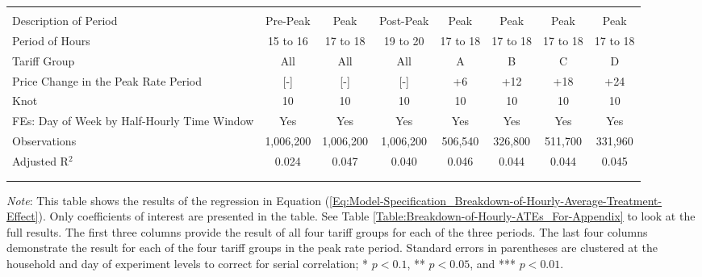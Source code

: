 {\begin{table}[t!]
\begin{adjustbox}{scale = 0.75}
\begin{threeparttable}
\begin{tabular}{@{\extracolsep{10pt}}lccccccc}
                    & & & & & & & \\
                    \hline
                    \\[-2.0ex]
                    Description of Period & Pre-Peak & Peak & Post-Peak & Peak & Peak & Peak & Peak \\
                    Period of Hours & 15 to 16 & 17 to 18 & 19 to 20 & 17 to 18 & 17 to 18 & 17 to 18 & 17 to 18 \\
                    Tariff Group & All & All & All & A & B & C & D \\
                    Price Change in the Peak Rate Period & [-] & [-] & [-] & +6 & +12 & +18 & +24 \\
                    Knot & 10 & 10 & 10 & 10 & 10 & 10 & 10 \\
                    FEs: Day of Week by Half-Hourly Time Window & Yes & Yes & Yes & Yes & Yes & Yes & Yes \\
                    Observations & 1,006,200 & 1,006,200 & 1,006,200 & 506,540 & 326,800 & 511,700 & 331,960 \\
                    Adjusted R$^{2}$ & 0.024 & 0.047 & 0.040 & 0.046 & 0.044 & 0.044 & 0.045 \\
                    \\[-2.0ex]
                    \hline \hline
                    \\[-4.5ex]
                \end{tabular}
                \begin{tablenotes}[flushleft]
                    \footnotesize
                    \item
                    \item \textit{Note}: This table shows the results of the regression in Equation (\ref{Eq:Model-Specification_Breakdown-of-Hourly-Average-Treatment-Effect}). Only coefficients of interest are presented in the table. See Table \ref{Table:Breakdown-of-Hourly-ATEs_For-Appendix} to look at the full results. The first three columns provide the result of all four tariff groups for each of the three periods. The last four columns demonstrate the result for each of the four tariff groups in the peak rate period. Standard errors in parentheses are clustered at the household and day of experiment levels to correct for serial correlation; * $p < 0.1$, ** $p < 0.05$, and *** $p < 0.01$.
                \end{tablenotes}
            \end{threeparttable}
        \end{adjustbox}
    \end{table}
}
